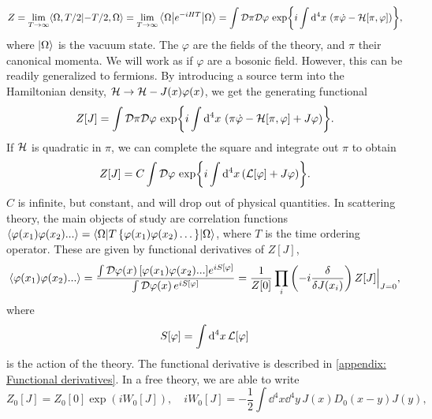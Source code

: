 \begin{equation}
    Z = \lim_{T\rightarrow \infty} \langle {\Omega, T/2} | {-T/2, \Omega} \rangle
    = \lim_{T\rightarrow \infty} \left\langle \Omega {\left|  e^{-iHT}  \right|} \Omega \right\rangle
    = \int \mathcal D \pi \mathcal D \varphi \, \exp{ i \int \dd^4 x \, \left(\pi \dot \varphi - \mathcal{H}[\pi, \varphi]\right) },
\end{equation}
%
where $\ket{\Omega}$ is the vacuum state.
The  $\varphi$ are the fields of the theory, and $\pi$ their canonical momenta. We will work as if $\varphi$ are a bosonic field. 
However, this can be readily generalized to fermions.
By introducing a source term into the Hamiltonian density, $\mathcal{H} \rightarrow \mathcal{H} - J(x)\varphi(x)$, we get the generating functional
%
\begin{equation}
    Z[J] = 
    \int \mathcal D \pi \mathcal D \varphi \, 
    \exp{ i \int \dd^4 x \, \left(\pi \dot \varphi - \mathcal{H}[\pi, \varphi]+ J\varphi\right)}.
\end{equation}
%
If $\mathcal{H}$ is quadratic in $\pi$, we can complete the square and integrate out $\pi$ to obtain
%
\begin{equation}
    Z[J] = C \int \mathcal D \varphi \, \exp{i \int \dd^4 x\, (\mathcal{L}[\varphi] + J \varphi)}.
\end{equation}
%
$C$ is infinite, but constant, and will drop out of physical quantities.
In scattering theory, the main objects of study are correlation functions 
$\left\langle \varphi(x_1)\varphi(x_2)... \right\rangle = \left\langle \Omega {\left| T\left\{\varphi(x_1)\varphi(x_2)\dots\right\} \right|} \Omega \right\rangle$,
where $T$ is the time ordering operator.
These are given by functional derivatives of $Z[J]$,
%
\begin{equation}
    \label{correlator from generating functional}
    \ex{\varphi(x_1)\varphi(x_2)...}
    = 
    \frac{\int \D \varphi(x)\, [\varphi(x_1)\varphi(x_2)...] e^{i S[\varphi]}}
        {\int \D \varphi(x)\, e^{i S[\varphi]}}
    =
    \frac{1}{Z[0]} \prod_i\left( -i  \fdv{}{J(x_i)} \right) Z[J]\Big|_{J = 0},
\end{equation}
%
where
%
\begin{equation}
    S[\varphi] = \int \dd^4 x \, \mathcal{L}[\varphi]
\end{equation}
%
is the action of the theory.
The functional derivative is described in \autoref{appendix: Functional derivatives}.
In a free theory, we are able to write
%
\begin{equation}
    Z_0[J] = Z_0[0] \exp(i W_0[J]), \quad 
    iW_0[J] = -\frac{1}{2} \int \dd^4 x \dd^4 y \, J(x) D_0(x - y) J(y),
\end{equation}
